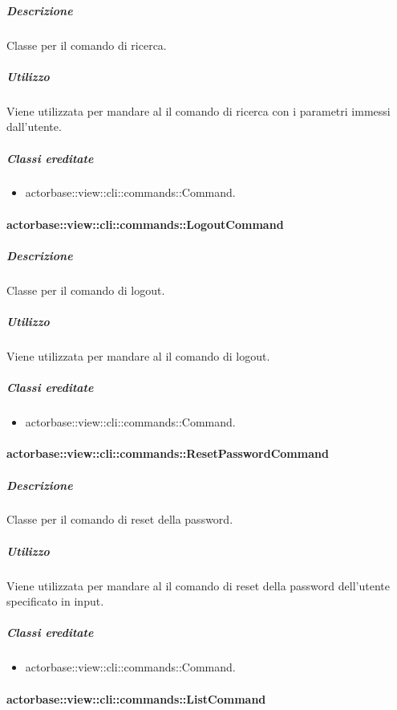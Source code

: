 \documentclass{scalatekids-article}
\begin{document}
\subparagraph{Descrizione}

Classe per il comando di ricerca.

\subparagraph{Utilizzo}

Viene utilizzata per mandare al  il comando di ricerca con i parametri immessi dall'utente.

\subparagraph{Classi ereditate}

\begin{itemize}
\item actorbase::view::cli::commands::Command.
\end{itemize}

\paragraph{actorbase::view::cli::commands::LogoutCommand}

\subparagraph{Descrizione}

Classe per il comando di logout.

\subparagraph{Utilizzo}

Viene utilizzata per mandare al  il comando di logout.

\subparagraph{Classi ereditate}

\begin{itemize}
\item actorbase::view::cli::commands::Command.
\end{itemize}

\paragraph{actorbase::view::cli::commands::ResetPasswordCommand}

\subparagraph{Descrizione}

Classe per il comando di reset della password.

\subparagraph{Utilizzo}

Viene utilizzata per mandare al  il comando di reset della password dell'utente specificato in input.

\subparagraph{Classi ereditate}

\begin{itemize}
\item actorbase::view::cli::commands::Command.
\end{itemize}

\paragraph{actorbase::view::cli::commands::ListCommand}
\end{document}
